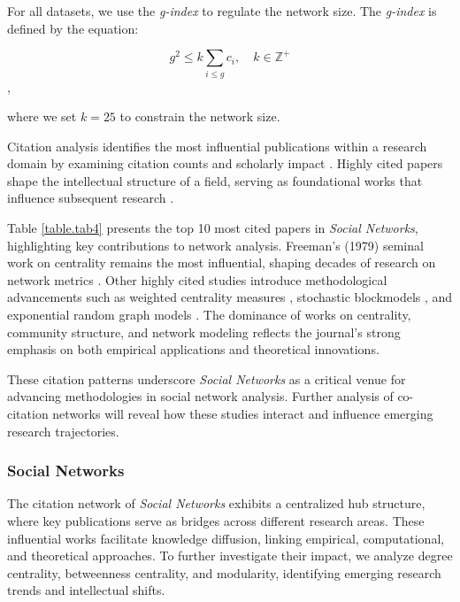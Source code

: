\documentclass[twocolumn]{article}
\begin{document}
For all datasets, we use the \textit{g-index} to regulate the network size. The \textit{g-index} is defined by the equation:

$$g^2 \leq k \sum_{i \leq g} c_i, \quad k \in \mathbb{Z}^+$$,

where we set $k = 25$ to constrain the network size.


Citation analysis identifies the most influential publications within a research domain by examining citation counts and scholarly impact \cite{Garfield1972, Small1973}. Highly cited papers shape the intellectual structure of a field, serving as foundational works that influence subsequent research \cite{Leydesdorff1998, Moed2005}. 

Table \ref{table.tab4} presents the top 10 most cited papers in \textit{Social Networks}, highlighting key contributions to network analysis. Freeman’s (1979) seminal work on centrality remains the most influential, shaping decades of research on network metrics \cite{Freeman1979}. Other highly cited studies introduce methodological advancements such as weighted centrality measures \cite{Opsahl2010}, stochastic blockmodels \cite{Holland1983}, and exponential random graph models \cite{Robins2007}. The dominance of works on centrality, community structure, and network modeling reflects the journal’s strong emphasis on both empirical applications and theoretical innovations.

These citation patterns underscore \textit{Social Networks} as a critical venue for advancing methodologies in social network analysis. Further analysis of co-citation networks will reveal how these studies interact and influence emerging research trajectories.


	\subsubsection*{Social Networks}
	
	The citation network of \textit{Social Networks} exhibits a centralized hub structure, where key publications serve as bridges across different research areas. These influential works facilitate knowledge diffusion, linking empirical, computational, and theoretical approaches. To further investigate their impact, we analyze degree centrality, betweenness centrality, and modularity, identifying emerging research trends and intellectual shifts.
	
\end{document}
